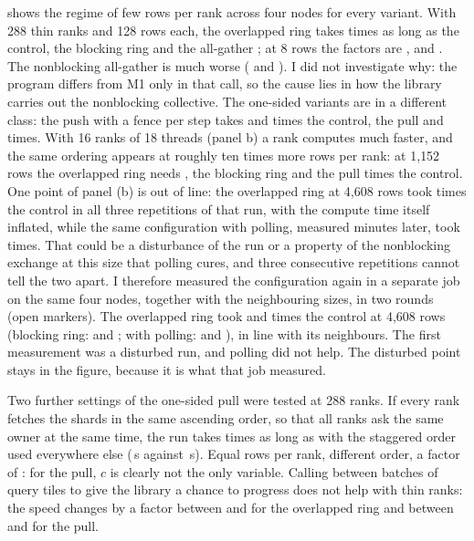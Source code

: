  shows the regime of few rows per rank across four nodes for every
variant. With 288 thin ranks and 128 rows each, the overlapped ring takes
 times as long as the control, the blocking ring
 and the all-gather ; at 8
rows the factors are ,  and
. The nonblocking all-gather is much worse
( and ). I did not
investigate why: the program differs from M1 only in that call, so the cause
lies in how the library carries out the nonblocking collective. The
one-sided variants are in a different class: the push with a fence per step takes
 and  times the control, the
pull  and  times. With 16 ranks
of 18 threads (panel b) a rank computes much faster, and the same ordering appears
at roughly ten times more rows per rank: at 1{,}152 rows the overlapped ring needs
, the blocking ring  and the
pull  times the control. One point of panel (b) is out
of line: the overlapped ring at 4{,}608 rows took  times
the control in all three repetitions of that run, with the compute time itself
inflated, while the same configuration with polling, measured minutes later, took
 times. That could be a disturbance of the run or a
property of the nonblocking exchange at this size that polling cures, and three
consecutive repetitions cannot tell the two apart. I therefore measured the
configuration again in a separate job on the same four nodes, together with the
neighbouring sizes, in two rounds (open markers). The overlapped ring took
 and  times the control at
4{,}608 rows (blocking ring:  and
; with polling:  and
), in line with its neighbours. The first
measurement was a disturbed run, and polling did not help. The disturbed point
stays in the figure, because it is what that job measured.

Two further settings of the one-sided pull were tested at 288 ranks. If every rank
fetches the shards in the same ascending order, so that all ranks ask the same
owner at the same time, the run takes  times as long as with the
staggered order used everywhere else (\,s against
\,s). Equal rows per rank, different order, a factor of : for the pull, $c$
is clearly not the only variable. Calling  between batches of
query tiles to give the library a chance to progress does not help with thin
ranks: the speed changes by a factor between  and
 for the overlapped ring and between  and
 for the pull.

